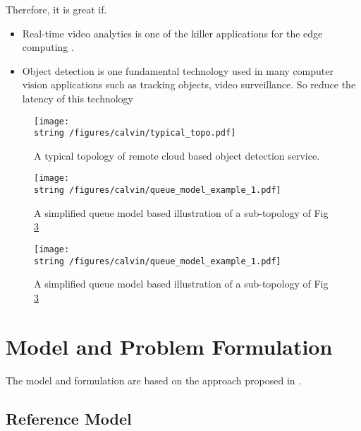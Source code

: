 \documentclass[12pt]{article}
\begin{document}
Therefore, it is great if.

\begin{itemize}

    \item Real-time video analytics is one of the killer applications for the edge computing
        \cite{ananthanarayanan2017real}.

    \item Object detection is one fundamental technology used in many computer vision applications such as tracking
        objects, video surveillance. So reduce the latency of this technology

\end{itemize}

\begin{figure}[h]
    \centering
    \label{pic:123}
    \texttt{[image: \\string~/figures/calvin/typical\_topo.pdf]}
    \caption{A typical topology of remote cloud based object detection service.}
    \label{fig:typical_topology}
\end{figure}

\begin{figure}[h]
    \centering
    \label{pic:123}
    \texttt{[image: \\string~/figures/calvin/queue\_model\_example\_1.pdf]}
    \caption{A simplified queue model based illustration of a sub-topology of Fig \ref{fig:typical_topology}}
    \label{fig:typical_topology}
\end{figure}

\begin{figure}[h]
    \centering
    \label{pic:123}
    \texttt{[image: \\string~/figures/calvin/queue\_model\_example\_1.pdf]}
    \caption{A simplified queue model based illustration of a sub-topology of Fig \ref{fig:typical_topology}}
    \label{fig:typical_topology}
\end{figure}

\section{Model and Problem Formulation}%
\label{sec:queuing_model}

The model and formulation are based on the approach proposed in \cite{agarwal_vnf_2019}.

\subsection{Reference Model}%
\label{sub:queue_model}
\end{document}
